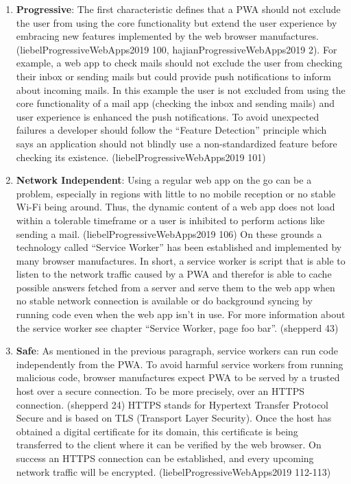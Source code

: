 \begin{enumerate} 
	\item  \textbf{Progressive}: The first characteristic defines that a PWA should not exclude the user from using the core functionality but extend the user experience by embracing new features implemented by the web browser manufactures. (liebelProgressiveWebApps2019 100, hajianProgressiveWebApps2019 2). For example, a web app to check mails should not exclude the user from checking their inbox or sending mails but could provide push notifications to inform about incoming mails. In this example the user is not excluded from using the core functionality of a mail app (checking the inbox and sending mails) and user experience is enhanced the push notifications. To avoid unexpected failures a developer should follow the “Feature Detection” principle which says an application should not blindly use a non-standardized feature before checking its existence. (liebelProgressiveWebApps2019 101)

	\item \textbf{Network Independent}: Using a regular web app on the go can be a problem, especially in regions with little to no mobile reception or no stable Wi-Fi being around. Thus, the dynamic content of a web app does not load within a tolerable timeframe or a user is inhibited to perform actions like sending a mail. (liebelProgressiveWebApps2019 106) On these grounds a technology called “Service Worker” has been established and implemented by many browser manufactures. In short, a service worker is script that is able to listen to the network traffic caused by a PWA and therefor is able to cache possible answers fetched from a server and serve them to the web app when no stable network connection is available or do background syncing by running code even when the web app isn’t in use. For more information about the service worker see chapter “Service Worker, page foo bar”. (shepperd 43)

	\item \textbf{Safe}: As mentioned in the previous paragraph, service workers can run code independently from the PWA. To avoid harmful service workers from running malicious code, browser manufactures expect PWA to be served by a trusted host over a secure connection. To be more precisely, over an HTTPS connection. (shepperd 24) HTTPS stands for Hypertext Transfer Protocol Secure and is based on TLS (Transport Layer Security). Once the host has obtained a digital certificate for its domain, this certificate is being transferred to the client where it can be verified by the web browser. On success an HTTPS connection can be established, and every upcoming network traffic will be encrypted. (liebelProgressiveWebApps2019 112-113)


\end{enumerate}
